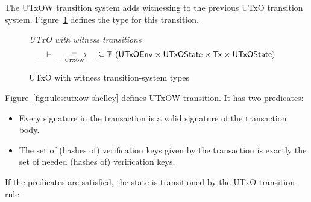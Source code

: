 The UTxOW transition system adds witnessing to the previous UTxO transition system.
Figure~\ref{fig:ts-types:utxow-shelley} defines the type for this transition.

\begin{figure}
  \emph{UTxO with witness transitions}
  \begin{equation*}
    \var{\_} \vdash
    \var{\_} \trans{utxow}{\_} \var{\_}
    \subseteq \powerset (\UTxOEnv \times \UTxOState \times \Tx \times \UTxOState)
  \end{equation*}
  \caption{UTxO with witness transition-system types}
  \label{fig:ts-types:utxow-shelley}
\end{figure}

Figure~\ref{fig:rules:utxow-shelley} defines UTxOW transition.
It has two predicates:
\begin{itemize}
  \item Every signature in the transaction is a valid signature of the transaction body.
  \item The set of (hashes of) verification keys given by the transaction is exactly
    the set of needed (hashes of) verification keys.
\end{itemize}
If the predicates are satisfied, the state is transitioned by the UTxO transition rule.

